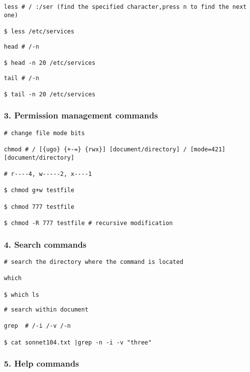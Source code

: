 \documentclass[
]{article}
\begin{document}
\begin{verbatim}
less # / :/ser (find the specified character,press n to find the next one)

$ less /etc/services
\end{verbatim}

\begin{verbatim}
head # /-n

$ head -n 20 /etc/services
\end{verbatim}

\begin{verbatim}
tail # /-n

$ tail -n 20 /etc/services
\end{verbatim}

\hypertarget{header-n9}{%
\subsubsection{3. Permission management commands}\label{header-n9}}

\begin{verbatim}
# change file mode bits

chmod # / [{ugo} {+-=} {rwx}] [document/directory] / [mode=421] [document/directory]

# r----4, w-----2, x----1

$ chmod g+w testfile

$ chmod 777 testfile

$ chmod -R 777 testfile # recursive modification
\end{verbatim}

\hypertarget{header-n8}{%
\subsubsection{4. Search commands}\label{header-n8}}

\begin{verbatim}
# search the directory where the command is located

which 

$ which ls
\end{verbatim}

\begin{verbatim}
# search within document

grep  # /-i /-v /-n

$ cat sonnet104.txt |grep -n -i -v "three"
\end{verbatim}

\hypertarget{header-n6}{%
\subsubsection{5. Help commands}\label{header-n6}}
\end{document}
